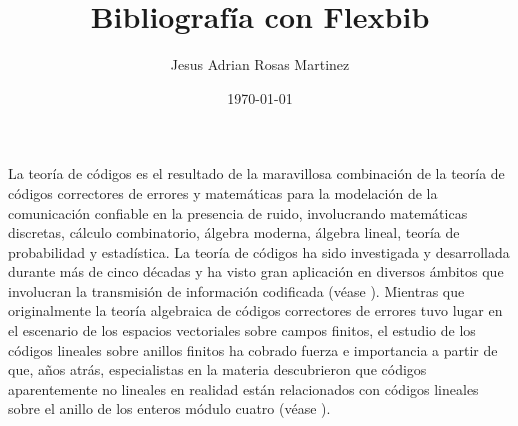 \documentclass[12pt]{article}
\title{Bibliografía con Flexbib}
\author{Jesus Adrian Rosas Martinez}
\date{\small{\today}}
\begin{document}
\maketitle %

La teoría de códigos es el resultado de la maravillosa combinación de la teoría de códigos correctores de errores y matemáticas para la modelación de la comunicación confiable en la presencia de ruido, involucrando matemáticas discretas, cálculo combinatorio, álgebra moderna, álgebra lineal, teoría de probabilidad y estadística. La teoría de códigos ha sido investigada y desarrollada durante más de cinco décadas y ha visto gran aplicación en diversos ámbitos que involucran la transmisión de información codificada (véase \cite{Lint}). Mientras que originalmente la teoría algebraica de códigos correctores de errores tuvo lugar en el escenario de los espacios vectoriales sobre campos finitos, el estudio de los códigos lineales sobre anillos finitos ha cobrado
fuerza e importancia a partir de que, años atrás, especialistas en la materia descubrieron que códigos aparentemente no lineales en realidad están relacionados con códigos lineales sobre el anillo de los enteros módulo cuatro (véase \cite{Calderbank}).


\nocite{Conway, Honold, Ling, Pless, Qian}

\end{document}
